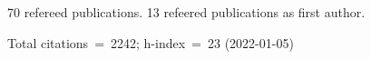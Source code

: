 70 refereed publications. 13 refeered publications as first author.

Total citations~=~2242; h-index~=~23 (2022-01-05)